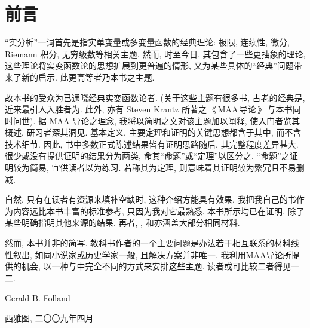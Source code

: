 \documentclass[twoside, fontset=fandol, punct=kaiming]{ctexbook}
\theoremstyle{innocent}
\begin{document}
\begin{titlepage}
\end{titlepage}
\chapter*{前言}
``实分析''一词首先是指实单变量或多变量函数的经典理论: 极限, 连续性, 微分, Riemann 积分, 无穷级数等相关主题. 然而, 时至今日, 其包含了一些更抽象的理论, 这些理论将实变函数论的思想扩展到更普遍的情形, 又为某些具体的``经典''问题带来了新的启示. 此更高等者乃本书之主题.

故本书的受众为已通晓经典实变函数论者. (关于这些主题有很多书, 古老的经典是\cite{rudin1976principles}, 近来最引人入胜者为\cite{korner2004companion}. 此外, 亦有 Steven Krantz 所著之\,《\,MAA\,导论\,》\,\cite{krantz2014guide}与本书同时问世). 据 MAA 导论之理念, 我将以简明之文对该主题加以阐释, 使入门者览其概述, 研习者深其洞见. 基本定义, 主要定理和证明的关键思想都含于其中, 而不含技术细节. 因此, 书中多数正式陈述结果皆有证明思路随后, 其完整程度差异甚大. 很少或没有提供证明的结果分为两类, 命其``命题''或``定理''以区分之. ``命题''之证明较为简易, 宜供读者以为练习. 若称其为定理, 则意味着其证明较为繁冗且不易删减.

自然, 只有在读者有资源来填补空缺时, 这种介绍方能具有效果. 我把我自己的书\cite{folland1999real}作为内容远比本书丰富的标准参考, 只因为我对它最熟悉. 本书所示均已在\cite{folland1999real}证明, 除了某些明确指明其他来源的结果. 再者, \cite{lang2012real}, \cite{royden1988real}和\cite{rudin1987realcomplex}亦涵盖大部分相同材料.

然而, 本书并非\cite{folland1999real}的简写. 教科书作者的一个主要问题是办法若干相互联系的材料线性叙出, 如同小说家或历史学家一般, 且解决方案并非唯一. 我利用MAA导论所提供的机会, 以一种与\cite{folland1999real}中完全不同的方式来安排这些主题. 读者或可比较二者得见一二.

\begin{flushright}
    {Gerald B. Folland}\par\kaishu 西雅图, 二〇〇九年四月
\end{flushright}
\end{document}
